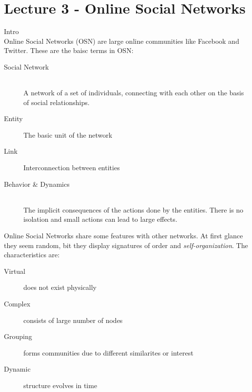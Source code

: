 \section{Lecture 3 - Online Social Networks} %
\label{sec:lecture_3_online_social_networks}

Intro\\
Online Social Networks (OSN) are large online communities like Facebook and Twitter.
These are the baisc terms in OSN:\\
\begin{description}
	\item[Social Network] \hfill \\
	A network of a set of individuals,
	connecting with each other on the basis of social relationships.
	\item[Entity] The basic unit of the network
	\item[Link] Interconnection between entities
	\item[Behavior \& Dynamics] \hfill \\
	The implicit consequences of the actions done by the entities.
	There is no isolation and small actions can lead to large effects.
\end{description}

Online Social Networks share some features with other networks.
At first glance they seem random,
bit they display signatures of order and \emph{self-organization}.
The characteristics are:\\
\begin{description}
	\item[Virtual] does not exist physically
	\item[Complex] consists of large number of nodes
	\item[Grouping] forms communities due to different similarites or interest
	\item[Dynamic] structure evolves in time
\end{description}

